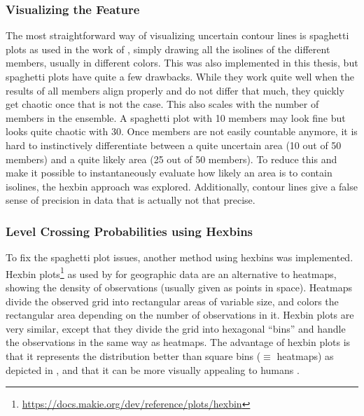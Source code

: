 \subsubsection{Visualizing the Feature}

The most straightforward way of visualizing uncertain contour lines is spaghetti plots as used in the work of , simply drawing all the isolines of the different members, usually in different colors. 
This was also implemented in this thesis, but spaghetti plots have quite a few drawbacks. 
While they work quite well when the results of all members align properly and do not differ that much, they quickly get chaotic once that is not the case. 
This also scales with the number of members in the ensemble. 
A spaghetti plot with 10 members may look fine but looks quite chaotic with 30. 
Once members are not easily countable anymore, it is hard to instinctively differentiate between a quite uncertain area (10 out of 50 members) and a quite likely area (25 out of 50 members). 
To reduce this and make it possible to instantaneously evaluate how likely an area is to contain isolines, the hexbin approach was explored.
Additionally, contour lines give a false sense of precision in data that is actually not that precise. 

\subsubsection{Level Crossing Probabilities using Hexbins}

To fix the spaghetti plot issues, another method using hexbins was implemented. 
Hexbin plots\footnote{\url{https://docs.makie.org/dev/reference/plots/hexbin}} as used by  for geographic data are an alternative to heatmaps, showing the density of observations (usually given as points in space). 
Heatmaps divide the observed grid into rectangular areas of variable size, and colors the rectangular area depending on the number of observations in it. 
Hexbin plots are very similar, except that they divide the grid into hexagonal \enquote{bins} and handle the observations in the same way as heatmaps. 
The advantage of hexbin plots is that it represents the distribution better than square bins ($\equiv$ heatmaps) as depicted in \cite{carr_hexagon_1992}, and that it can be more visually appealing to humans \cite{carr_hexagon_1992}. 


